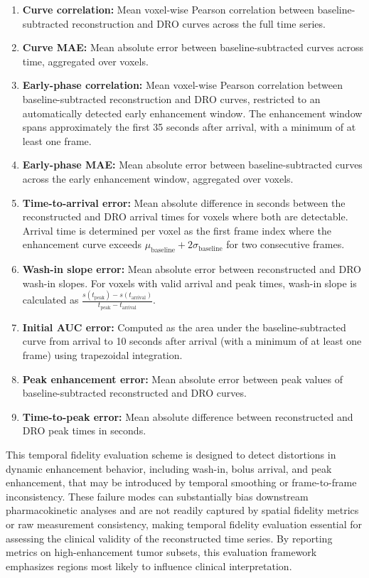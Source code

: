 \documentclass[runningheads]{llncs}
\begin{document}
\begin{enumerate}
    \item \textbf{Curve correlation:} Mean voxel-wise Pearson correlation between baseline-subtracted reconstruction and DRO curves across the full time series. 
    \item \textbf{Curve MAE:} Mean absolute error between baseline-subtracted curves across time, aggregated over voxels. 
    \item \textbf{Early-phase correlation:} Mean voxel-wise Pearson correlation between baseline-subtracted reconstruction and DRO curves, restricted to an automatically detected early enhancement window. The enhancement window spans approximately the first 35 seconds after arrival, with a minimum of at least one frame.
    \item \textbf{Early-phase MAE:} Mean absolute error between baseline-subtracted curves across the early enhancement window, aggregated over voxels.
    \item \textbf{Time-to-arrival error:} Mean absolute difference in seconds between the reconstructed and DRO arrival times for voxels where both are detectable. Arrival time is determined per voxel as the first frame index where the enhancement curve exceeds $\mu_{\text{baseline}} + 2\sigma_{\text{baseline}}$ for two consecutive frames.
    \item \textbf{Wash-in slope error:} Mean absolute error between reconstructed and DRO wash-in slopes. For voxels with valid arrival and peak times, wash-in slope is calculated as $\frac{s(t_{\text{peak}}) - s(t_{\text{arrival}})}{t_{\text{peak}} - t_{\text{arrival}}}$.
    \item \textbf{Initial AUC error:} Computed as the area under the baseline-subtracted curve from arrival to 10 seconds after arrival (with a minimum of at least one frame) using trapezoidal integration.
    \item \textbf{Peak enhancement error:} Mean absolute error between peak values of baseline-subtracted reconstructed and DRO curves.
    \item \textbf{Time-to-peak error:} Mean absolute difference between reconstructed and DRO peak times in seconds. 
\end{enumerate}

This temporal fidelity evaluation scheme is designed to detect distortions in dynamic enhancement behavior, including wash-in, bolus arrival, and peak enhancement, that may be introduced by temporal smoothing or frame-to-frame inconsistency. These failure modes can substantially bias downstream pharmacokinetic analyses and are not readily captured by spatial fidelity metrics or raw measurement consistency, making temporal fidelity evaluation essential for assessing the clinical validity of the reconstructed time series. By reporting metrics on high-enhancement tumor subsets, this evaluation framework emphasizes regions most likely to influence clinical interpretation.
\end{document}
